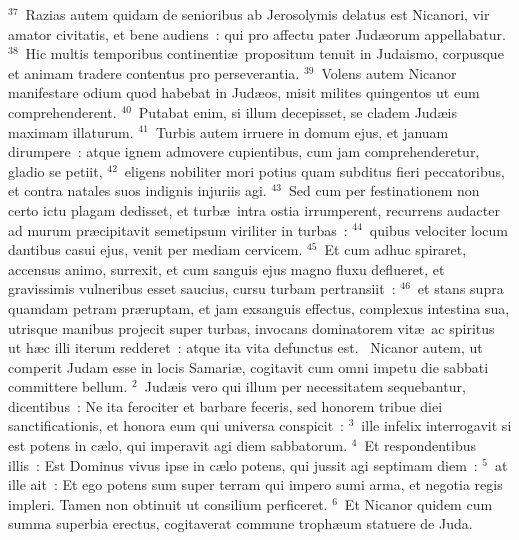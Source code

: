 ${}^{37}$~Razias autem quidam de senioribus ab Jerosolymis delatus est Nicanori, vir amator civitatis, et bene audiens~: qui pro affectu pater Jud\ae orum appellabatur.
${}^{38}$~Hic multis temporibus continenti\ae\ propositum tenuit in Judaismo, corpusque et animam tradere contentus pro perseverantia.
${}^{39}$~Volens autem Nicanor manifestare odium quod habebat in Jud\ae os, misit milites quingentos ut eum comprehenderent.
${}^{40}$~Putabat enim, si illum decepisset, se cladem Jud\ae is maximam illaturum.
${}^{41}$~Turbis autem irruere in domum ejus, et januam dirumpere~: atque ignem admovere cupientibus, cum jam comprehenderetur, gladio se petiit,
${}^{42}$~eligens nobiliter mori potius quam subditus fieri peccatoribus, et contra natales suos indignis injuriis agi.
${}^{43}$~Sed cum per festinationem non certo ictu plagam dedisset, et turb\ae\ intra ostia irrumperent, recurrens audacter ad murum pr\ae cipitavit semetipsum viriliter in turbas~:
${}^{44}$~quibus velociter locum dantibus casui ejus, venit per mediam cervicem.
${}^{45}$~Et cum adhuc spiraret, accensus animo, surrexit, et cum sanguis ejus magno fluxu deflueret, et gravissimis vulneribus esset saucius, cursu turbam pertransiit~:
${}^{46}$~et stans supra quamdam petram pr\ae ruptam, et jam exsanguis effectus, complexus intestina sua, utrisque manibus projecit super turbas, invocans dominatorem vit\ae\ ac spiritus ut h\ae c illi iterum redderet~: atque ita vita defunctus est.
~Nicanor autem, ut comperit Judam esse in locis Samari\ae , cogitavit cum omni impetu die sabbati committere bellum.
${}^{2}$~Jud\ae is vero qui illum per necessitatem sequebantur, dicentibus~: Ne ita ferociter et barbare feceris, sed honorem tribue diei sanctificationis, et honora eum qui universa conspicit~:
${}^{3}$~ille infelix interrogavit si est potens in c\ae lo, qui imperavit agi diem sabbatorum.
${}^{4}$~Et respondentibus illis~: Est Dominus vivus ipse in c\ae lo potens, qui jussit agi septimam diem~:
${}^{5}$~at ille ait~: Et ego potens sum super terram qui impero sumi arma, et negotia regis impleri. Tamen non obtinuit ut consilium perficeret.
${}^{6}$~Et Nicanor quidem cum summa superbia erectus, cogitaverat commune troph\ae um statuere de Juda.


